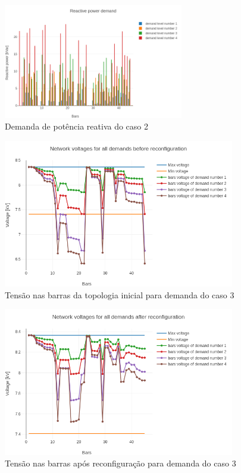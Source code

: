 \begin{figure}[H]
    \centering
    \includegraphics[width=0.7\textwidth]{7_Results/img/reactive_demand.png}
    \caption{Demanda de potência reativa do caso 2}
    \label{fig:45reactivepower2}
\end{figure}

\begin{figure}[H]
    \centering
    \includegraphics[width=0.9\textwidth]{7_Results/img/initial_voltages.png}
    \caption{Tensão nas barras da topologia inicial para demanda do caso 3}
    \label{fig:45voltages_init2}
\end{figure}

\begin{figure}[H]
    \centering
    \includegraphics[width=0.9\textwidth]{7_Results/img/reconfig_voltages.png}
    \caption{Tensão nas barras após reconfiguração para demanda do caso 3}
    \label{fig:45voltages_reconfigured2}
\end{figure}

